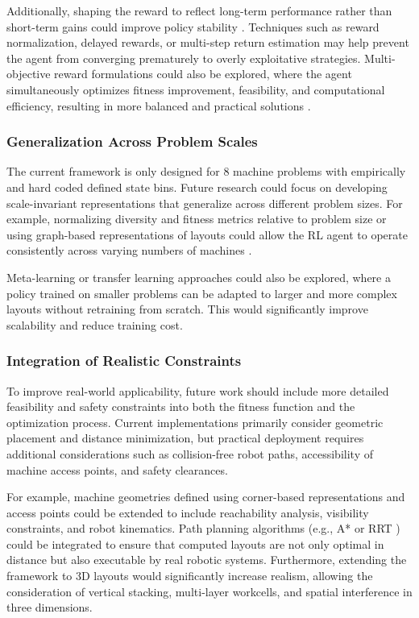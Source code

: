 \documentclass{article}
\begin{document}
Additionally, shaping the reward to reflect long-term performance rather than short-term gains could improve policy stability \parencite{ng1999policy}. Techniques such as reward normalization, delayed rewards, or multi-step return estimation may help prevent the agent from converging prematurely to overly exploitative strategies. Multi-objective reward formulations could also be explored, where the agent simultaneously optimizes fitness improvement, feasibility, and computational efficiency, resulting in more balanced and practical solutions \parencite{liu2014multiobjective}.

\subsubsection{Generalization Across Problem Scales}

The current framework is only designed for 8 machine problems with empirically and hard coded defined state bins. Future research could focus on developing scale-invariant representations that generalize across different problem sizes. For example, normalizing diversity and fitness metrics relative to problem size or using graph-based representations of layouts could allow the RL agent to operate consistently across varying numbers of machines \parencite{hospedales2020meta}.

Meta-learning \parencite{hospedales2020meta} or transfer learning \parencite{pan2010survey} approaches could also be explored, where a policy trained on smaller problems can be adapted to larger and more complex layouts without retraining from scratch. This would significantly improve scalability and reduce training cost.

\subsubsection{Integration of Realistic Constraints}

To improve real-world applicability, future work should include more detailed feasibility and safety constraints into both the fitness function and the optimization process. Current implementations primarily consider geometric placement and distance minimization, but practical deployment requires additional considerations such as collision-free robot paths, accessibility of machine access points, and safety clearances.

For example, machine geometries defined using corner-based representations and access points could be extended to include reachability analysis, visibility constraints, and robot kinematics. Path planning algorithms (e.g., A* \parencite{hart1968formal} or RRT \parencite{lavalle1998rapidly}) could be integrated to ensure that computed layouts are not only optimal in distance but also executable by real robotic systems. Furthermore, extending the framework to 3D layouts would significantly increase realism, allowing the consideration of vertical stacking, multi-layer workcells, and spatial interference in three dimensions.
\end{document}
